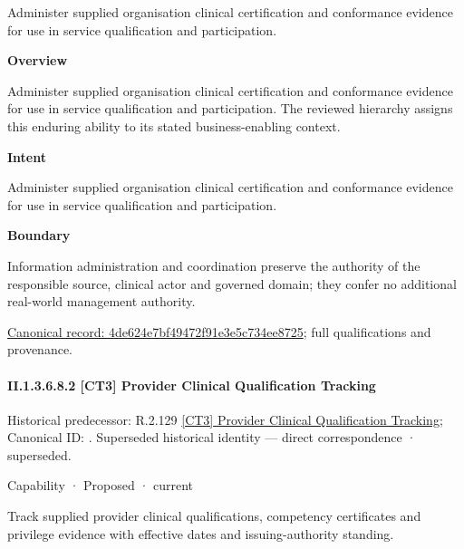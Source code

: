 Administer supplied organisation clinical certification and conformance evidence for use in service qualification and participation.



\textbf{Overview}



Administer supplied organisation clinical certification and conformance evidence for use in service qualification and participation. The reviewed hierarchy assigns this enduring ability to its stated business-enabling context.



\textbf{Intent}



Administer supplied organisation clinical certification and conformance evidence for use in service qualification and participation.



\textbf{Boundary}



Information administration and coordination preserve the authority of the responsible source, clinical actor and governed domain; they confer no additional real-world management authority.


{\footnotesize \href{../../../../../../../continuum/strategy/capability/4de624e7bf49472f91e3e5c734ee8725.md}{Canonical record: 4de624e7bf49472f91e3e5c734ee8725}; full qualifications and provenance.}\par
\paragraph*{II.1.3.6.8.2 [CT3] Provider Clinical Qualification Tracking}
\label{navigation:II.1.3.6.8.2}

{\small Historical predecessor: R.2.129 \hyperref[element:ab0415e2ea0a4da4ad3dc46997d48bc3]{[CT3] Provider Clinical Qualification Tracking}; Canonical ID: \texttt{}. Superseded historical identity — direct correspondence · superseded.}\par
\label{element:8fd5c78eba3046fa9153fb4efb44e9c8}
{\small Capability · Proposed · current}\par

Track supplied provider clinical qualifications, competency certificates and privilege evidence with effective dates and issuing-authority standing.



